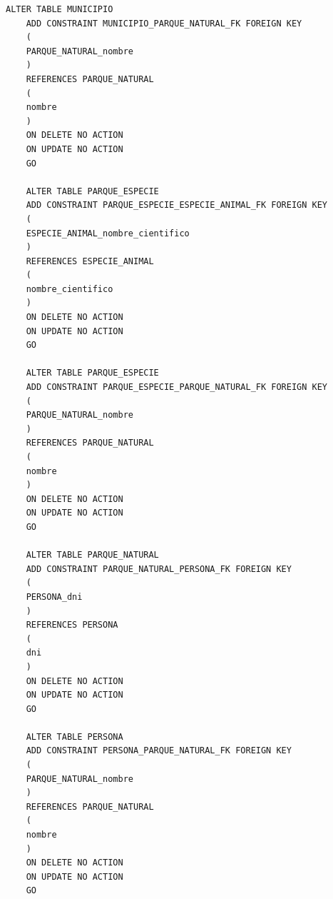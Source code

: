\documentclass{article}
\begin{document}
\begin{lstlisting}[style=ddlstyle, label=fig:p_ddl,caption=Definicion De Datos De Parques Naturales]
	ALTER TABLE MUNICIPIO 
	ADD CONSTRAINT MUNICIPIO_PARQUE_NATURAL_FK FOREIGN KEY 
	( 
	PARQUE_NATURAL_nombre
	) 
	REFERENCES PARQUE_NATURAL 
	( 
	nombre 
	) 
	ON DELETE NO ACTION 
	ON UPDATE NO ACTION 
	GO
	
	ALTER TABLE PARQUE_ESPECIE 
	ADD CONSTRAINT PARQUE_ESPECIE_ESPECIE_ANIMAL_FK FOREIGN KEY 
	( 
	ESPECIE_ANIMAL_nombre_cientifico
	) 
	REFERENCES ESPECIE_ANIMAL 
	( 
	nombre_cientifico 
	) 
	ON DELETE NO ACTION 
	ON UPDATE NO ACTION 
	GO
	
	ALTER TABLE PARQUE_ESPECIE 
	ADD CONSTRAINT PARQUE_ESPECIE_PARQUE_NATURAL_FK FOREIGN KEY 
	( 
	PARQUE_NATURAL_nombre
	) 
	REFERENCES PARQUE_NATURAL 
	( 
	nombre 
	) 
	ON DELETE NO ACTION 
	ON UPDATE NO ACTION 
	GO
	
	ALTER TABLE PARQUE_NATURAL 
	ADD CONSTRAINT PARQUE_NATURAL_PERSONA_FK FOREIGN KEY 
	( 
	PERSONA_dni
	) 
	REFERENCES PERSONA 
	( 
	dni 
	) 
	ON DELETE NO ACTION 
	ON UPDATE NO ACTION 
	GO
	
	ALTER TABLE PERSONA 
	ADD CONSTRAINT PERSONA_PARQUE_NATURAL_FK FOREIGN KEY 
	( 
	PARQUE_NATURAL_nombre
	) 
	REFERENCES PARQUE_NATURAL 
	( 
	nombre 
	) 
	ON DELETE NO ACTION 
	ON UPDATE NO ACTION 
	GO

\end{lstlisting}
\end{document}

